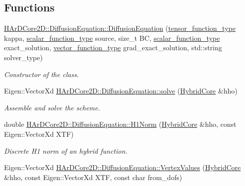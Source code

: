 \subsection*{Functions}
\begin{DoxyCompactItemize}
\item 
\hyperlink{group__HHO__diffusion_ga9a10d995a8b537474dc0d9a2e0a9a04b}{H\+Ar\+D\+Core2\+D\+::\+Diffusion\+Equation\+::\+Diffusion\+Equation} (\hyperlink{classHArDCore2D_1_1DiffusionEquation_acb28d76dbd9b3c07f20a996f74915b76}{tensor\+\_\+function\+\_\+type} kappa, \hyperlink{classHArDCore2D_1_1DiffusionEquation_ae1c7c45bf1c9402b11d431716f5e1936}{scalar\+\_\+function\+\_\+type} source, size\+\_\+t BC, \hyperlink{classHArDCore2D_1_1DiffusionEquation_ae1c7c45bf1c9402b11d431716f5e1936}{scalar\+\_\+function\+\_\+type} exact\+\_\+solution, \hyperlink{classHArDCore2D_1_1DiffusionEquation_a8fb1165da7a58b15bc4ed9a86829290a}{vector\+\_\+function\+\_\+type} grad\+\_\+exact\+\_\+solution, std\+::string solver\+\_\+type)
\begin{DoxyCompactList}\small\item\em Constructor of the class. \end{DoxyCompactList}\item 
\mbox{\label{group__HHO__diffusion_gaa5df2366a6063c0e11cd79f3f3ec3f5d}} 
Eigen\+::\+Vector\+Xd \hyperlink{group__HHO__diffusion_gaa5df2366a6063c0e11cd79f3f3ec3f5d}{H\+Ar\+D\+Core2\+D\+::\+Diffusion\+Equation\+::solve} (\hyperlink{classHArDCore2D_1_1HybridCore}{Hybrid\+Core} \&hho)
\begin{DoxyCompactList}\small\item\em Assemble and solve the scheme. \end{DoxyCompactList}\item 
\mbox{\label{group__HHO__diffusion_ga6859be195fb96cc7cf80839cd714dde8}} 
double \hyperlink{group__HHO__diffusion_ga6859be195fb96cc7cf80839cd714dde8}{H\+Ar\+D\+Core2\+D\+::\+Diffusion\+Equation\+::\+H1\+Norm} (\hyperlink{classHArDCore2D_1_1HybridCore}{Hybrid\+Core} \&hho, const Eigen\+::\+Vector\+Xd X\+TF)
\begin{DoxyCompactList}\small\item\em Discrete H1 norm of an hybrid function. \end{DoxyCompactList}\item 
Eigen\+::\+Vector\+Xd \hyperlink{group__HHO__diffusion_ga76c336893c4f79547a6059a816aa3532}{H\+Ar\+D\+Core2\+D\+::\+Diffusion\+Equation\+::\+Vertex\+Values} (\hyperlink{classHArDCore2D_1_1HybridCore}{Hybrid\+Core} \&hho, const Eigen\+::\+Vector\+Xd X\+TF, const char from\+\_\+dofs)

\end{DoxyCompactItemize}
